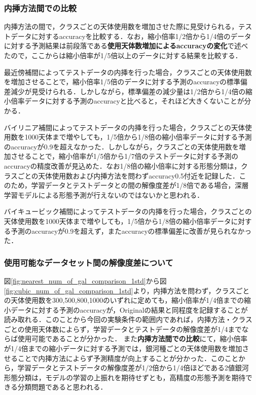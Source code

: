 \documentclass[a4j, 11pt]{jreport}
\begin{document}
\subsubsection{内挿方法間での比較}
内挿方法の間で，クラスごとの天体使用数を増加させた際に見受けられる，テストデータに対するaccuracyを比較する．なお，縮小倍率1/2倍から1/4倍のデータに対する予測結果は前段落である\textbf{使用天体数増加によるaccuracyの変化}で述べたので，ここからは縮小倍率が1/5倍以上のデータに対する結果を比較する．

最近傍補間によってテストデータの内挿を行った場合，クラスごとの天体使用数を増加させることで，縮小倍率1/5倍のデータに対する予測のaccuracyの標準偏差減少が見受けられる．しかしながら，標準偏差の減少量は1/2倍から1/4倍の縮小倍率データに対する予測のaccuracyと比べると，それほど大きくないことが分かる．

バイリニア補間によってテストデータの内挿を行った場合，クラスごとの天体使用数を1000天体まで増やしても，1/5倍から1/8倍の縮小倍率データに対する予測のaccuracyが0.9を超えなかった．しかしながら，クラスごとの天体使用数を増加させることで，縮小倍率が1/5倍から1/7倍のテストデータに対する予測のaccuracyの精度改善が見込めた．なお1/8倍の縮小倍率に対する形態分類は，クラスごとの天体使用数および内挿方法を問わずaccuracy0.5付近を記録した．このため，学習データとテストデータとの間の解像度差が1/8倍である場合，深層学習モデルによる形態予測が行えないのではないかと思われる．

バイキュービック補間によってテストデータの内挿を行った場合，クラスごとの天体使用数を1000天体まで増やしても，1/5倍から1/8倍の縮小倍率データに対する予測のaccuracyが0.9を超えず，またaccuracyの標準偏差に改善が見られなかった．

\subsubsection{使用可能なデータセット間の解像度差について}
図\ref{fig:nearest_num_of_gal_comparison_1std}から図\ref{fig:cubic_num_of_gal_comparison_1std}より，内挿方法を問わず，クラスごとの天体使用数を300,500,800,1000のいずれに定めても，縮小倍率が1/4倍までの縮小データに対する予測のaccuracyが，Originalの結果と同程度を記録することが読み取れる．このことから今回の実験条件の範囲内であれば，内挿方法・クラスごとの使用天体数によらず，学習データとテストデータの解像度差が1/4までならば使用可能であることが分かった．
また\textbf{内挿方法間での比較}にて，縮小倍率が1/4倍までの縮小データに対する予測では，銀河種ごとの天体使用数を増加させることで内挿方法によらず予測精度が向上することが分かった．このことから，学習データとテストデータの解像度差が1/2倍から1/4倍ほどである2値銀河形態分類は，モデルの学習の上振れを期待せずとも，高精度の形態予測を期待できる分類問題であると思われる．
\end{document}
